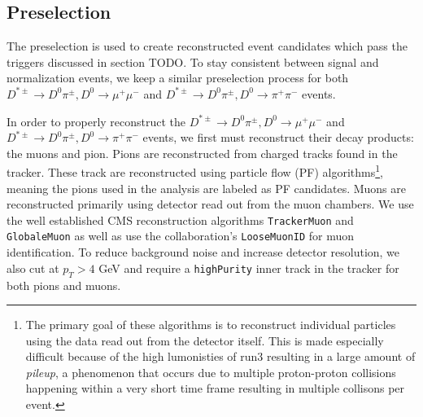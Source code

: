 \subsection{Preselection}
\label{subsec:preselection}

The preselection is used to create reconstructed event candidates which pass the triggers discussed in section TODO. To stay consistent between signal and normalization events, we keep a similar preselection process for both $D^{*\pm} \to D^0 \pi^\pm, D^0 \to \mu^+ \mu^-$ and $D^{*\pm} \to D^0 \pi^\pm, D^0 \to \pi^+ \pi^-$ events.

In order to properly reconstruct the $D^{*\pm} \to D^0 \pi^\pm, D^0 \to \mu^+ \mu^-$ and $D^{*\pm} \to D^0 \pi^\pm, D^0 \to \pi^+ \pi^-$ events, we first must reconstruct their decay products: the muons and pion. Pions are reconstructed from charged tracks found in the tracker. These track are reconstructed using particle flow (PF) algorithms\footnote{The primary goal of these algorithms is to reconstruct individual particles using the data read out from the detector itself. This is made especially difficult because of the high lumonisties of run3 resulting in a large amount of \textit{pileup}, a phenomenon that occurs due to multiple proton-proton collisions happening within a very short time frame resulting in multiple collisons per event. }, meaning the pions used in the analysis are labeled as PF candidates. Muons are reconstructed primarily using detector read out from the muon chambers. We use the well established CMS reconstruction algorithms \texttt{TrackerMuon} and \texttt{GlobaleMuon} as well as use the collaboration's \texttt{LooseMuonID} for muon identification. To reduce background noise and increase detector resolution, we also cut at $p_T>4$ GeV and require a \texttt{highPurity} inner track in the tracker for both pions and muons.


